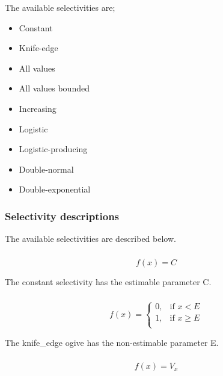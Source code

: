 The available selectivities are;

\begin{itemize}
  \item Constant
  \item Knife-edge
  \item All values
  \item All values bounded
  \item Increasing
  \item Logistic
  \item Logistic-producing
  \item Double-normal
  \item Double-exponential
\end{itemize}

\subsubsection{Selectivity descriptions}

The available selectivities are described below.

\subsubsection*{}

\begin{equation}
f(x)=C
\end{equation}

The constant selectivity has the estimable parameter C. 

\subsubsection*{}

\begin{equation}
f(x)= \begin{cases}
  0, & \text{if $x < E$} \\
  1, & \text{if $x \ge E$}\\ 
  \end{cases} 
\end{equation}

The knife\_edge ogive has the non-estimable parameter E.

\subsubsection*{}

\begin{equation}
f(x)=V_x
\end{equation}

